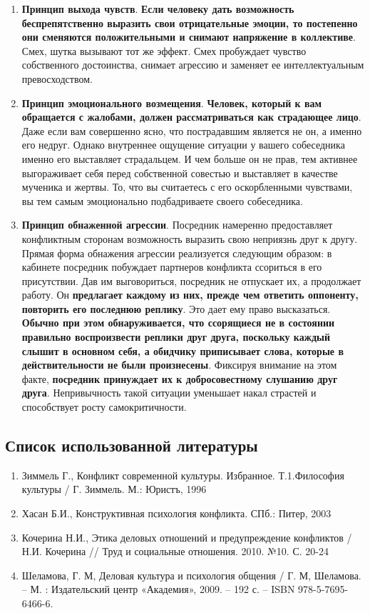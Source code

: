 \documentclass{article}
\begin{document}
\begin{enumerate}
    \item \textbf{Принцип выхода чувств}. \textbf{Если человеку дать возможность беспрепятственно выразить свои отрицательные эмоции, то постепенно они сменяются положительными и снимают напряжение в коллективе}. Смех, шутка вызывают тот же эффект. Смех пробуждает чувство собственного достоинства, снимает агрессию и заменяет ее интеллектуальным превосходством.
    \item \textbf{Принцип эмоционального возмещения}. \textbf{Человек, который к вам обращается с жалобами, должен рассматриваться как страдающее лицо}. Даже если вам совершенно ясно, что пострадавшим является не он, а именно его недруг. Однако внутреннее ощущение ситуации у вашего собеседника именно его выставляет страдальцем. И чем больше он не прав, тем активнее выгораживает себя перед собственной совестью и выставляет в качестве мученика и жертвы. То, что вы считаетесь с его оскорбленными чувствами, вы тем самым эмоционально подбадриваете своего собеседника.
    \item \textbf{Принцип обнаженной агрессии}. Посредник намеренно предоставляет конфликтным сторонам возможность выразить свою неприязнь друг к другу. Прямая форма обнажения агрессии реализуется следующим образом: в кабинете посредник побуждает партнеров конфликта ссориться в его присутствии. Дав им выговориться, посредник не отпускает их, а продолжает работу. Он \textbf{предлагает каждому из них, прежде чем ответить оппоненту, повторить его последнюю реплику}. Это дает ему право высказаться. \textbf{Обычно при этом обнаруживается, что ссорящиеся не в состоянии правильно воспроизвести реплики друг друга, поскольку каждый слышит в основном себя, а обидчику приписывает слова, которые в действительности не были произнесены}. Фиксируя внимание на этом факте, \textbf{посредник принуждает их к добросовестному слушанию друг друга}. Непривычность такой ситуации уменьшает накал страстей и способствует росту самокритичности.
\end{enumerate}

\subsection{Список использованной литературы}

\begin{enumerate}
    \item Зиммель Г., Конфликт современной культуры. Избранное. Т.1.Философия культуры / Г. Зиммель. М.: Юристъ, 1996
    \item Хасан Б.И., Конструктивная психология конфликта. СПб.: Питер, 2003
    \item Кочерина Н.И., Этика деловых отношений и предупреждение конфликтов / Н.И. Кочерина // Труд и социальные отношения. 2010. №10. С. 20-24
    \item Шеламова, Г. М, Деловая культура и психология общения / Г. М, Шеламова. – М. : Издательский центр «Академия», 2009. – 192 с. – ISBN 978-5-7695-6466-6.
\end{enumerate}
\end{document}
